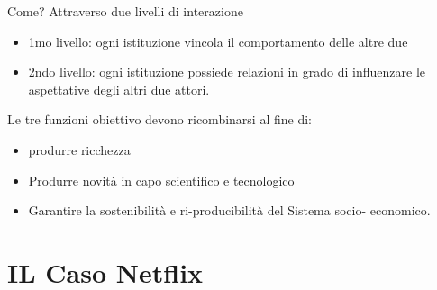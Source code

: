 \documentclass{article}
\begin{document}
Come? Attraverso due livelli di interazione
\begin{itemize}
	\item 1mo livello: ogni istituzione vincola il comportamento delle altre due
	\item 2ndo livello: ogni istituzione possiede relazioni in grado di influenzare le
	aspettative degli altri due attori. 
\end{itemize}

Le tre funzioni obiettivo devono
ricombinarsi al fine di:
\begin{itemize}
	\item	produrre ricchezza
	\item Produrre novità in capo scientifico e tecnologico
	\item Garantire la sostenibilità e ri-producibilità del Sistema socio-
	economico.
\end{itemize}


\section{IL Caso Netflix}
\end{document}
